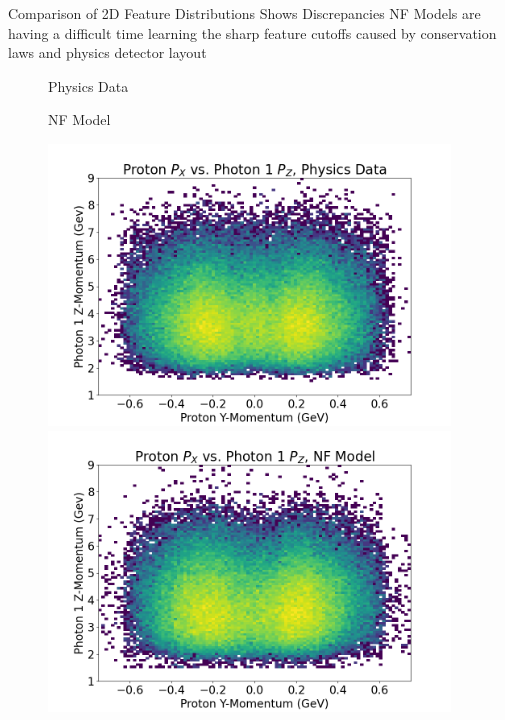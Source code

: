 \documentclass[aspectratio=169]{beamer}
\begin{document}
\begin{frame}{Comparison of 2D Feature Distributions Shows Discrepancies}
NF Models are having a difficult time learning the sharp feature cutoffs caused by conservation laws and physics detector layout
\begin{figure}[!ht]
  
    \begin{minipage}{.2\textwidth}
        
        Physics Data\\
        
        \vspace{1cm}
        
  
        NF Model\\
    \end{minipage}%
    \begin{minipage}{.2573\textwidth}
    
        \centering
        \includegraphics[width=0.95\textwidth,trim={0 0 0 0},clip]{images/Hists2D/Proton_P_X_vs_Photon_1_P_Z,_Physics_Data.png}
        \includegraphics[width=0.95\textwidth,trim={0 0 0 0},clip]{images/Hists2D/Proton_P_X_vs_Photon_1_P_Z,_NF_Model.png}


\end{minipage}
\end{figure}
\end{frame}
\end{document}
